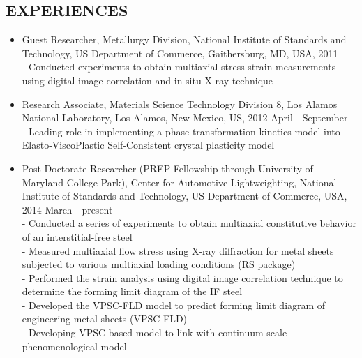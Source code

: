 \documentclass{res}
\begin{document}
\begin{resume}
  \section{EXPERIENCES}
  \begin{itemize}
  \item Guest Researcher, Metallurgy Division, National Institute of
    Standards and Technology, US Department of Commerce, Gaithersburg,
    MD, USA, 2011\\
    - Conducted experiments to obtain multiaxial stress-strain measurements
    using digital image correlation and in-situ X-ray technique
  \item Research Associate, Materials Science Technology Division 8, Los Alamos
    National Laboratory, Los Alamos, New Mexico, US, 2012 April - September \\
    - Leading role in implementing a phase transformation kinetics model into Elasto-ViscoPlastic Self-Consistent crystal plasticity model
  \item Post Doctorate Researcher (PREP Fellowship through University of Maryland College Park), Center for Automotive Lightweighting,
    National Institute of Standards and Technology, US Department of Commerce, USA, 2014 March - present\\
    - Conducted a series of experiments to obtain multiaxial constitutive behavior of an interstitial-free steel\\
    - Measured multiaxial flow stress using X-ray diffraction for metal sheets subjected to various multiaxial loading conditions (RS package)\\
    - Performed the strain analysis using digital image correlation technique to determine the forming limit diagram of the IF steel\\
    - Developed the VPSC-FLD model to predict forming limit diagram of engineering metal sheets (VPSC-FLD)\\
    - Developing VPSC-based model to link with continuum-scale phenomenological model
  \end{itemize}


\end{resume}
\end{document}
